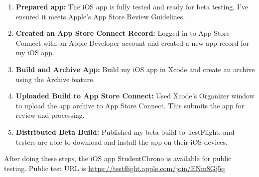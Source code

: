 \documentclass[
  biblatex,
  language=english,
  figures=false,
  sourcecodes,
  glossaries,
  index
]{kidiplom}
\begin{document}
\begin{enumerate}
    \item \textbf{Prepared app:} The iOS app is fully tested and ready for beta testing. I've ensured it meets Apple's App Store Review Guidelines.
    \item \textbf{Created an App Store Connect Record:} Logged in to App Store Connect with an Apple Developer account and created a new app record for my iOS app.
    \item \textbf{Build and Archive App:} Build my iOS app in Xcode and create an archive using the Archive feature.    
    \item \textbf{Uploaded Build to App Store Connect:} Used Xcode's Organizer window to upload the app archive to App Store Connect. This submits the app for review and processing.
    \item \textbf{Distributed Beta Build:} Published my beta build to TestFlight, and testers are able to download and install the app on their iOS devices.
 \end{enumerate}
 
After doing these steps, the iOS app StudentChrono is available for public testing. Public test URL is \url{https://testflight.apple.com/join/ENm8Gj5q}
\end{document}
